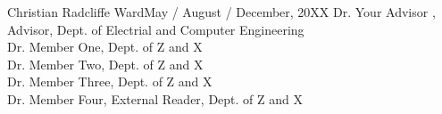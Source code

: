\documentclass[reqno,12pt,oneside]{report} %
\theoremstyle{plain}
\theoremstyle{definition}
\theoremstyle{remark}
\numberwithin{theorem}{chapter}
\begin{document}
\initializefrontsections

{Christian Radcliffe Ward}{May / August / December, 20XX}
{Dr. Your Advisor , Advisor, Dept. of Electrial and Computer Engineering \\
 Dr. Member One, Dept. of Z and X \\
 Dr. Member Two, Dept. of Z and X \\
 Dr. Member Three, Dept. of Z and X \\
 Dr. Member Four, External Reader, Dept. of Z and X \\
}




\makeatletter
\if@twoside \setcounter{page}{2} \else \setcounter{page}{1} \fi
\makeatother

\startabstractpage

\label{Abstract}

\startacknowledgementspage

\label{Acknowledgements}


%

\tableofcontents     %
\listoffigures       %
\listoftables        %
\listofabbreviations %

\startthechapters
\end{document}
